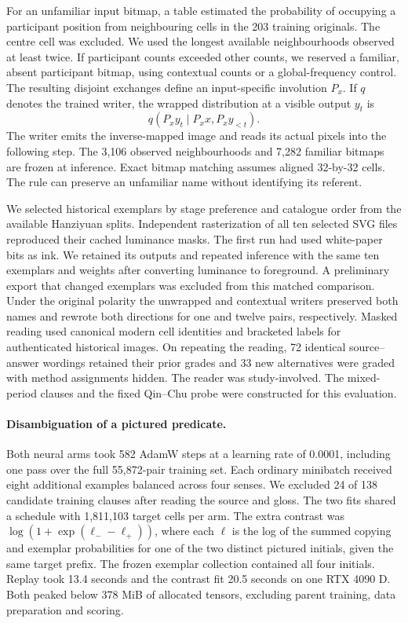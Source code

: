 \documentclass[12pt,a4paper]{article}
\providecommand{\DIFadd}[1]{{\protect\color{blue} \sf #1}} %
\begin{document}
\DIFadd{For an unfamiliar input bitmap, a table estimated the probability of occupying a participant position from neighbouring cells in the 203 training originals. The centre cell was excluded. We used the longest available neighbourhoods observed at least twice. If participant counts exceeded other counts, we reserved a familiar, absent participant bitmap, using contextual counts or a global-frequency control. The resulting disjoint exchanges define an input-specific involution $P_x$. If $q$ denotes the trained writer, the wrapped distribution at a visible output $y_t$ is
}\[
 q(P_x y_t\mid P_x x, P_x y_{<t}).
\]
\DIFadd{The writer emits the inverse-mapped image and reads its actual pixels into the following step. The 3,106 observed neighbourhoods and 7,282 familiar bitmaps are frozen at inference. Exact bitmap matching assumes aligned 32-by-32 cells. The rule can preserve an unfamiliar name without identifying its referent.
}

\DIFadd{We selected historical exemplars by stage preference and catalogue order from the available Hanziyuan splits. Independent rasterization of all ten selected SVG files reproduced their cached luminance masks. The first run had used white-paper bits as ink. We retained its outputs and repeated inference with the same ten exemplars and weights after converting luminance to foreground. A preliminary export that changed exemplars was excluded from this matched comparison. Under the original polarity the unwrapped and contextual writers preserved both names and rewrote both directions for one and twelve pairs, respectively. Masked reading used canonical modern cell identities and bracketed labels for authenticated historical images. On repeating the reading, 72 identical source--answer wordings retained their prior grades and 33 new alternatives were graded with method assignments hidden. The reader was study-involved. The mixed-period clauses and the fixed Qin--Chu probe were constructed for this evaluation.
}

\paragraph{\DIFadd{Disambiguation of a pictured predicate.}}
\DIFadd{Both neural arms took 582 AdamW steps at a learning rate of 0.0001, including one pass over the full 55,872-pair training set. Each ordinary minibatch received eight additional examples balanced across four senses. We excluded 24 of 138 candidate training clauses after reading the source and gloss. The two fits shared a schedule with 1,811,103 target cells per arm. The extra contrast was $\log(1+\exp(\ell_{-}-\ell_{+}))$, where each $\ell$ is the log of the summed copying and exemplar probabilities for one of the two distinct pictured initials, given the same target prefix. The frozen exemplar collection contained all four initials. Replay took 13.4 seconds and the contrast fit 20.5 seconds on one RTX 4090 D. Both peaked below 378 MiB of allocated tensors, excluding parent training, data preparation and scoring.
}
\end{document}
